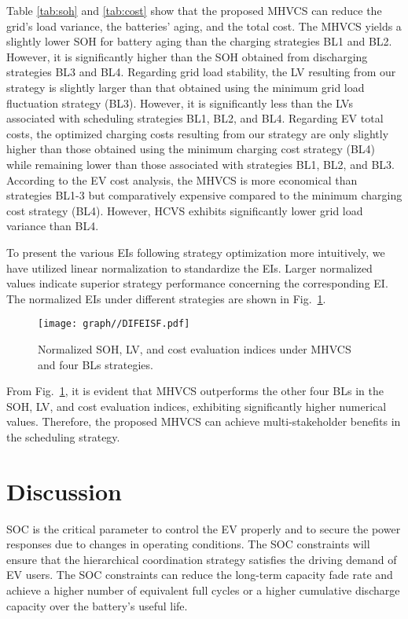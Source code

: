 \documentclass[journal,twoside]{IEEEtran}
\begin{document}
Table \ref{tab:soh} and \ref{tab:cost} show that the proposed MHVCS can reduce the grid's load variance, the batteries' aging, and the total cost. The MHVCS yields a slightly lower SOH for battery aging than the charging strategies BL1 and BL2. However, it is significantly higher than the SOH obtained from discharging strategies BL3 and BL4. Regarding grid load stability, the LV resulting from our strategy is slightly larger than that obtained using the minimum grid load fluctuation strategy (BL3). However, it is significantly less than the LVs associated with scheduling strategies BL1, BL2, and BL4.
Regarding EV total costs, the optimized charging costs resulting from our strategy are only slightly higher than those obtained using the minimum charging cost strategy (BL4) while remaining lower than those associated with strategies BL1, BL2, and BL3. According to the EV cost analysis, the MHVCS is more economical than strategies BL1-3 but comparatively expensive compared to the minimum charging cost strategy (BL4). However, HCVS exhibits significantly lower grid load variance than BL4.

To present the various EIs following strategy optimization more intuitively, we have utilized linear normalization to standardize the EIs. Larger normalized values indicate superior strategy performance concerning the corresponding EI. The normalized EIs under different strategies are shown in Fig.~\ref{fig:nei}.
\begin{figure}[h]
\centering
\texttt{[image: graph//DIFEISF.pdf]}
\caption{Normalized SOH, LV, and cost evaluation indices under MHVCS and four BLs strategies.}
\label{fig:nei}
\end{figure}

From Fig.~\ref{fig:nei}, it is evident that MHVCS outperforms the other four BLs in the SOH, LV, and cost evaluation indices, exhibiting significantly higher numerical values. Therefore, the proposed MHVCS can achieve multi-stakeholder benefits in the scheduling strategy.

\section{Discussion}

SOC is the critical parameter to control the EV properly and to secure the power responses due to changes in operating conditions. The SOC constraints will ensure that the hierarchical coordination strategy satisfies the driving demand of EV users. The SOC constraints can reduce the long-term capacity fade rate and achieve a higher number of equivalent full cycles or a higher cumulative discharge capacity over the battery's useful life.
\end{document}
